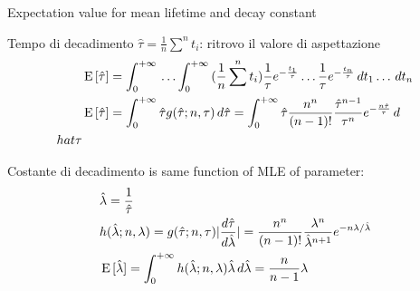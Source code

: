 \documentclass[asd-beamer.tex]{subfiles}
\begin{document}
\begin{frame}{Expectation value for mean lifetime and decay constant}
\begin{block}{Tempo di decadimento}
$\hat{\tau}=\frac{1}{n}\sum^nt_i$: ritrovo il valore di aspettazione
\begin{align*}
&\operatorname{E}{[\hat{\tau}]}=\int_{0}^{+\infty}{}\ldots\int_{0}^{+\infty}{}(\frac{1}{n}\sum^nt_i)\frac{1}{\tau}e^{-\frac{t_1}{\tau}}\ldots\frac{1}{\tau}e^{-\frac{t_n}{\tau}}\,dt_1\ldots\,dt_n\\
&\operatorname{E}{[\hat{\tau}]}=\int_{0}^{+\infty}{}\hat{\tau}g(\hat{\tau};n,\tau)\,d\hat{\tau}=\int_{0}^{+\infty}{}\hat{\tau}\frac{n^n}{(n-1)!}\frac{\hat{\tau}^{n-1}}{\tau^n}e^{-\frac{n\hat{\tau}}{\tau}}\,d\\hat{\tau}
\end{align*}
\end{block}
\begin{block}{Costante di decadimento}
 is same function of MLE of parameter:
\begin{align*}
&\hat{\lambda}=\frac{1}{\hat{\tau}}\\
&h(\hat{\lambda};n,\lambda)=g(\hat{\tau};n,\tau)|\frac{d \hat{\tau}}{d \hat{\lambda}}|=\frac{n^n}{(n-1)!}\frac{\lambda^n}{\hat{\lambda}^{n+1}}e^{-n\lambda/\hat{\lambda}}\\
&\operatorname{E}{[\hat{\lambda}]}=\int_{0}^{+\infty}{}h(\hat{\lambda};n,\lambda)\hat{\lambda}\,d\hat{\lambda}=\frac{n}{n-1}\lambda
\end{align*}
\end{block}
\end{frame}
\end{document}
